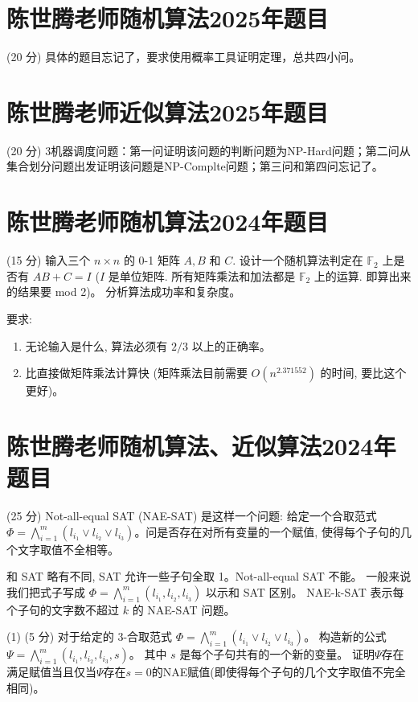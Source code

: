 \documentclass{article}
\date{}
\begin{document}
\section*{陈世腾老师随机算法2025年题目}
(20 分) 具体的题目忘记了，要求使用概率工具证明定理，总共四小问。


\section*{陈世腾老师近似算法2025年题目}
 (20 分) 3机器调度问题：第一问证明该问题的判断问题为NP-Hard问题；第二问从集合划分问题出发证明该问题是NP-Complte问题；第三问和第四问忘记了。

\newpage
\section*{陈世腾老师随机算法2024年题目}
(15 分) 输入三个 $n \times n$ 的 0-1 矩阵 $A, B$ 和 $C$. 设计一个随机算法判定在 $\mathbb{F}_2$ 上是否有 $AB+C = I$ ($I$ 是单位矩阵. 所有矩阵乘法和加法都是 $\mathbb{F}_2$ 上的运算. 即算出来的结果要 mod 2)。 分析算法成功率和复杂度。

要求: 

\begin{enumerate}
    \item 无论输入是什么, 算法必须有 $2/3$ 以上的正确率。
    \item 比直接做矩阵乘法计算快 (矩阵乘法目前需要 $O(n^{2.371552})$ 的时间, 要比这个更好)。
\end{enumerate}


\newpage
\section*{陈世腾老师随机算法、近似算法2024年题目}
 (25 分) Not-all-equal SAT (NAE-SAT) 是这样一个问题: 给定一个合取范式 $\Phi = \bigwedge_{i=1}^{m} (l_{i_1} \lor l_{i_2} \lor l_{i_3})$。问是否存在对所有变量的一个赋值, 使得每个子句的几个文字取值不全相等。

和 SAT 略有不同, SAT 允许一些子句全取 1。Not-all-equal SAT 不能。 一般来说我们把式子写成 $\Phi = \bigwedge_{i=1}^{m} (l_{i_1}, l_{i_2}, l_{i_3})$ 以示和 SAT 区别。 NAE-k-SAT 表示每个子句的文字数不超过 $k$ 的 NAE-SAT 问题。

    (1) (5 分) 对于给定的 3-合取范式 $\Phi = \bigwedge_{i=1}^{m} (l_{i_1} \lor l_{i_2} \lor l_{i_3})$。 构造新的公式 $\Psi = \bigwedge_{i=1}^{m} (l_{i_1}, l_{i_2}, l_{i_3}, s)$。 其中 $s$ 是每个子句共有的一个新的变量。 证明$\Psi$存在满足赋值当且仅当$\Psi$存在$s=0$的NAE赋值(即使得每个子句的几个文字取值不完全相同)。
\end{document}
